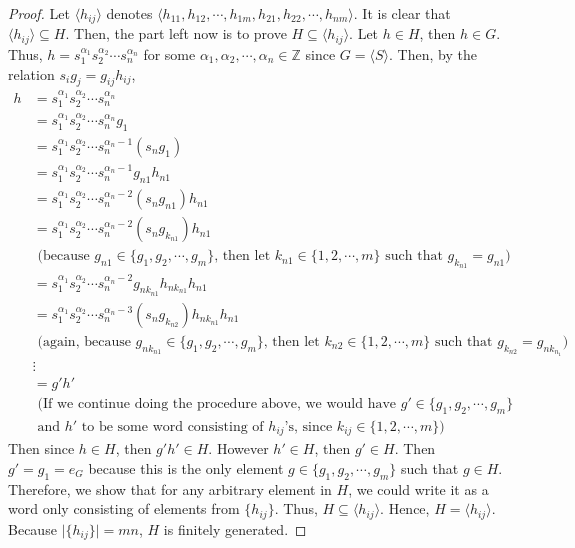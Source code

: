 \begin{answer}
\begin{proof}
        Let $\langle h_{ij} \rangle$ denotes $\langle h_{11},h_{12},\cdots,h_{1m},h_{21},h_{22},\cdots,h_{nm} \rangle$. It is clear that $\langle h_{ij} \rangle \subseteq H$. Then, the part left now is to prove $H \subseteq \langle h_{ij}\rangle$. Let $h \in H$, then $h \in G$. Thus, $h = s_1^{\alpha_1}s_2^{\alpha_2}\cdots s_n^{\alpha_n}$ for some $\alpha_1,\alpha_2,\cdots,\alpha_n \in \mathbb{Z}$ since $G = \langle S \rangle$. Then, by the relation $s_ig_j = g_{ij}h_{ij}$,
        \begin{equation}
            \begin{aligned}
                    h &= s_1^{\alpha_1}s_2^{\alpha_2}\cdots s_n^{\alpha_n}\\
                    &= s_1^{\alpha_1}s_2^{\alpha_2}\cdots s_n^{\alpha_n}g_1\\
                    &= s_1^{\alpha_1}s_2^{\alpha_2}\cdots s_n^{\alpha_n-1}(s_ng_1)\\
                    &= s_1^{\alpha_1}s_2^{\alpha_2}\cdots s_n^{\alpha_n-1}g_{n1}h_{n1}\\
                    &= s_1^{\alpha_1}s_2^{\alpha_2}\cdots s_n^{\alpha_n-2}(s_ng_{n1})h_{n1}\\
                    &= s_1^{\alpha_1}s_2^{\alpha_2}\cdots s_n^{\alpha_n-2}(s_ng_{k_{n1}})h_{n1}\\
                    &\text{ (because $g_{n1} \in \{g_1,g_2,\cdots,g_m\}$, then let $k_{n1} \in \{1,2,\cdots,m\}$ such that $g_{k_{n1}} = g_{n1}$)}\\
                    &= s_1^{\alpha_1}s_2^{\alpha_2}\cdots s_n^{\alpha_n-2}g_{nk_{n1}}h_{nk_{n1}}h_{n1}\\
                    &= s_1^{\alpha_1}s_2^{\alpha_2}\cdots s_n^{\alpha_n-3}(s_ng_{k_{n2}})h_{nk_{n1}}h_{n1}\\
                    &\text{ (again, because $g_{nk_{n1}} \in \{g_1,g_2,\cdots,g_m\}$, then let $k_{n2} \in \{1,2,\cdots,m\}$ such that $g_{k_{n2}} = g_{nk_{n_1}}$)}\\
                    &\vdots\\
                    &= g'h'\\
                    & \text{ (If we continue doing the procedure above, we would have $g' \in \{g_1,g_2,\cdots,g_m\}$}\\
                    & \text{  and $h'$ to be some word consisting of $h_{ij}$'s, since $k_{ij} \in \{1,2,\cdots,m\}$)}
            \end{aligned}
        \end{equation}
        Then since $h \in H$, then $g'h' \in H$. However $h' \in H$, then $g' \in H$. Then $g' = g_1 = e_{G}$ because this is the only element $g \in \{g_1,g_2,\cdots,g_m\}$ such that $g \in H$. Therefore, we show that for any arbitrary element in $H$, we could write it as a word only consisting of elements from $\{ h_{ij} \}$. Thus, $H \subseteq \langle h_{ij} \rangle$. Hence, $H = \langle h_{ij} \rangle$. Because $\lvert \{ h_{ij} \} \rvert = mn$, $H$ is finitely generated.
    \end{proof}
\end{answer}